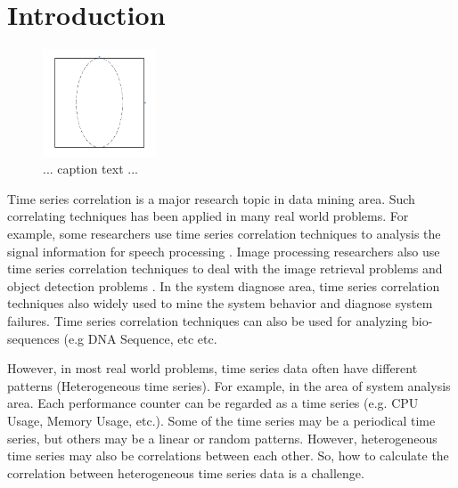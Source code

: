 \section{Introduction}
\label{sec:introduction}

\begin{figure}[t]
\centering
\includegraphics[width=0.3\textwidth]{temp.pdf}
\caption{ ... caption text ... }
\end{figure}

Time series correlation is a major research topic in data mining area. 
Such correlating techniques has been applied in many real world problems.
For example, some researchers use time series correlation techniques to analysis the signal information for speech processing \cite{rabiner1993fundamentals}.
Image processing researchers also use time series correlation techniques to deal with the image retrieval problems and object detection problems \cite{yang2002detecting, sonka2014image}.
In the system diagnose area\cite{luo2014correlating,sun2014querying}, time series correlation techniques also widely used to mine the system behavior and diagnose system failures. 
Time series correlation techniques can also be used for analyzing bio-sequences (e.g DNA Sequence, etc \cite{mount2001bioinformatics} etc. 

However, in most real world problems, time series data often have different patterns (Heterogeneous time series). For example, in the area of system analysis area. 
Each performance counter can be regarded as a time series (e.g. CPU Usage, Memory Usage, etc.).
Some of the time series may be a periodical time series, but others may be a linear or random patterns. 
However, heterogeneous time series may also be correlations between each other. 
So, how to calculate the correlation between heterogeneous time series data is a challenge. 


